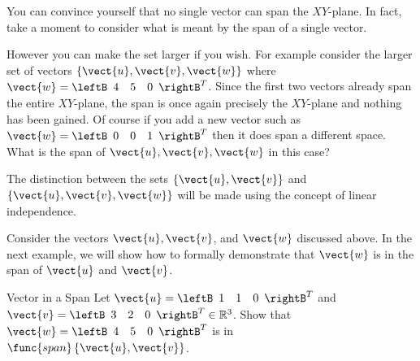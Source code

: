 You can convince yourself that no single vector can span the
$XY$-plane. In fact, take a moment to consider what is meant by the span of a single vector.

However you can make the set larger if you wish. For example consider
the larger set of vectors $\{ \vect{u}, \vect{v},
\vect{w}\}$ where $ \vect{w}=\leftB 
\begin{array}{rrr}
4 & 5 & 0
\end{array}
\rightB^T$. 
Since
the first two vectors already span the entire $XY$-plane, the span is
once again precisely the $XY$-plane and nothing has been gained. Of
course if you add a new vector such as
$ \vect{w}=\leftB 
\begin{array}{rrr}
0 & 0 & 1
\end{array}
\rightB^T$ then it does span a different space. What is the span of $\vect{u}, \vect{v}, \vect{w}$ in this case?   

The distinction between the sets $\{ \vect{u}, \vect{v}\}$ and $\{
\vect{u}, \vect{v}, \vect{w}\}$ will be made using the concept of linear independence. 

Consider the vectors $\vect{u}, \vect{v}$, and $\vect{w}$ discussed above. In the next example, we will show how to formally demonstrate that $\vect{w}$ is in the span of $\vect{u}$ and $\vect{v}$. 

\begin{example}{Vector in a Span}\label{exa:vectorinspan}
Let $\vect{u}=\leftB 
\begin{array}{rrr}
1  & 1 & 0
\end{array}
\rightB^T$ and
$\vect{v}=\leftB 
\begin{array}{rrr}
3  & 2 & 0
\end{array}
\rightB^T \in \mathbb{R}^{3}$. Show that $\vect{w} = \leftB 
\begin{array}{rrr}
4 & 5 & 0 
\end{array}
\rightB^{T}$ is in $\func{span} \left\{ \vect{u}, \vect{v} \right\}$.
\end{example}

